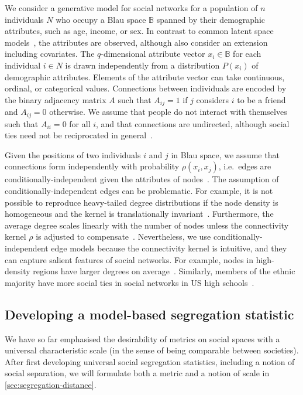 \documentclass{scrartcl}
\newcommand{\population}{N}
\newcommand{\blauspace}{\mathbb{B}}
\begin{document}
We consider a generative model for social networks for a population of $n$ individuals $\population$ who occupy a Blau space $\blauspace$ spanned by their demographic attributes, such as age, income, or sex. In contrast to common latent space models~\cite{Hoff2002, Hoff2008}, the attributes are observed, although \textcite{Hoff2002} also consider an extension including covariates. The $q$-dimensional attribute vector $x_i\in\blauspace$ for each individual $i\in \population$ is drawn independently from a distribution $P(x_i)$ of demographic attributes. Elements of the attribute vector can take continuous, ordinal, or categorical values. Connections between individuals are encoded by the binary adjacency matrix $A$ such that $A_{ij}=1$ if $j$ considers $i$ to be a friend and $A_{ij}=0$ otherwise. We assume that people do not interact with themselves such that $A_{ii}=0$ for all $i$, and that connections are undirected, although social ties need not be reciprocated in general~\cite{Ball2013}.

Given the positions of two individuals $i$ and $j$ in Blau space, we assume that connections form independently with probability $\rho(x_i, x_j)$, i.e.\ edges are conditionally-independent given the attributes of nodes~\cite{Fienberg2012}. The assumption of conditionally-in\-de\-pen\-dent edges can be problematic. For example, it is not possible to reproduce heavy-tailed degree distributions if the node density is homogeneous and the kernel is translationally invariant~\cite{Barnett2007}. Furthermore, the average degree scales linearly with the number of nodes unless the connectivity kernel $\rho$ is adjusted to compensate~\cite{Caron2017}. Nevertheless, we use conditionally-independent edge models because the connectivity kernel is intuitive, and they can capture salient features of social networks. For example, nodes in high-density regions have larger degrees on average~\cite{Barnett2007}. Similarly, members of the ethnic majority have more social ties in social networks in US high schools~\cite{Currarini2009}.

\subsection{Developing a model-based segregation statistic\label{sec:model-based-segregation}}

We have so far emphasised the desirability of metrics on social spaces with a universal characteristic scale (in the sense of being comparable between societies). After first developing universal social segregation statistics, including a notion of social separation, we will formulate both a metric and a notion of scale in \cref{sec:segregation-distance}.
\end{document}
